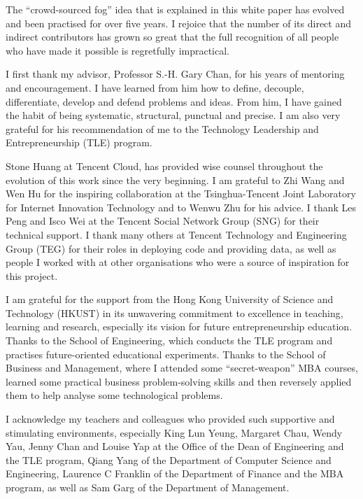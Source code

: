 The ``crowd-sourced fog'' idea that is explained in this white paper has evolved and been practised for over five years. I rejoice that the number of its direct and indirect contributors has grown so great that the full recognition of all people who have made it possible is regretfully impractical. 

I first thank my advisor, Professor S.-H. Gary Chan, for his years of mentoring and encouragement. I have learned from him how to define, decouple, differentiate, develop and defend problems and ideas. From him, I have gained the habit of being systematic, structural, punctual and precise. I am also very grateful for his recommendation of me to the Technology Leadership and Entrepreneurship (TLE) program. 

Stone Huang at Tencent Cloud, has provided wise counsel throughout the evolution of this work since the very beginning. I am grateful to Zhi Wang and Wen Hu for the inspiring collaboration at the Tsinghua-Tencent Joint Laboratory for Internet Innovation Technology and to Wenwu Zhu for his advice. I thank Les Peng and Isco Wei at the Tencent Social Network Group (SNG) for their technical support. I thank many others at Tencent Technology and Engineering Group (TEG) for their roles in deploying code and providing data, as well as people I worked with at other organisations who were a source of inspiration for this project.  

I am grateful for the support from the Hong Kong University of Science and Technology (HKUST) in its unwavering commitment to excellence in teaching, learning and research, especially its vision for future entrepreneurship education. Thanks to the School of Engineering, which conducts the TLE program and practises future-oriented educational experiments. Thanks to the School of Business and Management, where I attended some ``secret-weapon'' MBA courses, learned some practical business problem-solving skills and then reversely applied them to help analyse some technological problems. 

I acknowledge my teachers and colleagues who provided such supportive and stimulating environments, especially King Lun Yeung, Margaret Chau, Wendy Yau, Jenny Chan and Louise Yap at the Office of the Dean of Engineering and the TLE program, Qiang Yang of the Department of Computer Science and Engineering, Laurence C Franklin of the Department of Finance and the MBA program, as well as Sam Garg of the Department of Management. 

